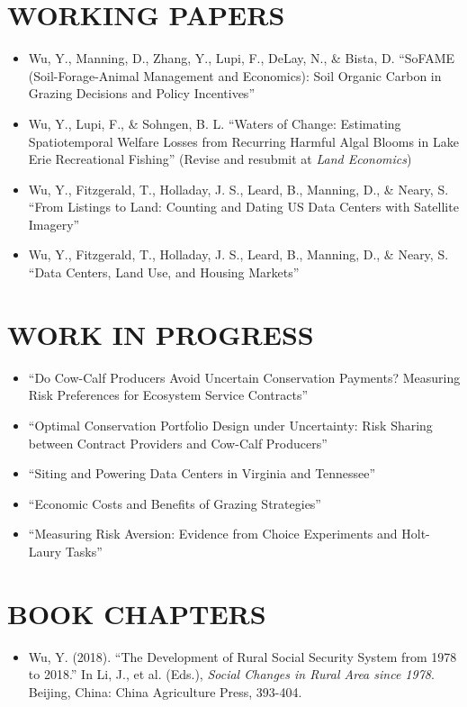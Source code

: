 \documentclass[letterpaper,11pt]{article}
\begin{document}
\section{WORKING PAPERS}
\begin{itemize}[leftmargin=1em, itemsep=4pt]
    \item[\small\textbullet] Wu, Y., Manning, D., Zhang, Y., Lupi, F., DeLay, N., \& Bista, D. ``SoFAME (Soil-Forage-Animal Management and Economics): Soil Organic Carbon in Grazing Decisions and Policy Incentives''
    \item[\small\textbullet] Wu, Y., Lupi, F., \& Sohngen, B. L. ``Waters of Change: Estimating Spatiotemporal Welfare Losses from Recurring Harmful Algal Blooms in Lake Erie Recreational Fishing'' (Revise and resubmit at \textit{Land Economics})
    \item[\small\textbullet] Wu, Y., Fitzgerald, T., Holladay, J. S., Leard, B., Manning, D., \& Neary, S. ``From Listings to Land: Counting and Dating US Data Centers with Satellite Imagery''
    \item[\small\textbullet] Wu, Y., Fitzgerald, T., Holladay, J. S., Leard, B., Manning, D., \& Neary, S. ``Data Centers, Land Use, and Housing Markets''
\end{itemize}


\section{WORK IN PROGRESS}
\begin{itemize}[leftmargin=1em, itemsep=4pt]
    \item[\small\textbullet] ``Do Cow-Calf Producers Avoid Uncertain Conservation Payments? Measuring Risk Preferences for Ecosystem Service Contracts''
    \item[\small\textbullet] ``Optimal Conservation Portfolio Design under Uncertainty: Risk Sharing between Contract Providers and Cow-Calf Producers''
    \item[\small\textbullet] ``Siting and Powering Data Centers in Virginia and Tennessee''
    \item[\small\textbullet] ``Economic Costs and Benefits of Grazing Strategies''
    \item[\small\textbullet] ``Measuring Risk Aversion: Evidence from Choice Experiments and Holt-Laury Tasks''
\end{itemize}

\section{BOOK CHAPTERS}
\begin{itemize}[leftmargin=1em]
    \item[\small\textbullet] Wu, Y. (2018). ``The Development of Rural Social Security System from 1978 to 2018.'' In Li, J., et al. (Eds.), \textit{Social Changes in Rural Area since 1978}. Beijing, China: China Agriculture Press, 393-404.
\end{itemize}
\end{document}
